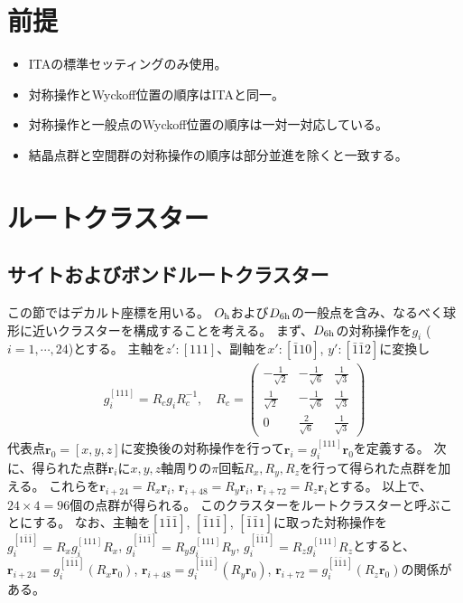 \documentclass[11pt]{easymemo}
\begin{document}


\section{前提}
\begin{itemize}
\item ITAの標準セッティングのみ使用。
\item 対称操作とWyckoff位置の順序はITAと同一。
\item 対称操作と一般点のWyckoff位置の順序は一対一対応している。
\item 結晶点群と空間群の対称操作の順序は部分並進を除くと一致する。
\end{itemize}

\section{ルートクラスター}

\subsection{サイトおよびボンドルートクラスター}

この節ではデカルト座標を用いる。
$O_{\rm h}$および$D_{\rm 6h}$の一般点を含み、なるべく球形に近いクラスターを構成することを考える。
まず、$D_{\rm 6h}$の対称操作を$g_i$ ($i=1,\cdots,24$)とする。
主軸を$z':[111]$、副軸を$x':[\bar{1}10]$, $y':[\bar{1}\bar{1}2]$に変換し
\begin{align}
g_i^{[111]}=R_cg_iR_c^{-1},
\quad
R_c = \begin{pmatrix}
-\frac{1}{\sqrt{2}} & -\frac{1}{\sqrt{6}} & \frac{1}{\sqrt{3}} \\
\frac{1}{\sqrt{2}} & -\frac{1}{\sqrt{6}} & \frac{1}{\sqrt{3}} \\
0 & \frac{2}{\sqrt{6}} & \frac{1}{\sqrt{3}}
\end{pmatrix}
\end{align}
代表点$\bm{r}_0=[x,y,z]$に変換後の対称操作を行って$\bm{r}_i=g_i^{[111]}\bm{r}_0$を定義する。
次に、得られた点群$\bm{r}_i$に$x,y,z$軸周りの$\pi$回転$R_x,R_y,R_z$を行って得られた点群を加える。
これらを$\bm{r}_{i+24}=R_x\bm{r}_i$, $\bm{r}_{i+48}=R_y\bm{r}_i$, $\bm{r}_{i+72}=R_z\bm{r}_i$とする。
以上で、$24\times 4=96$個の点群が得られる。
このクラスターをルートクラスターと呼ぶことにする。
なお、主軸を$[1\bar{1}\bar{1}]$, $[\bar{1}1\bar{1}]$, $[\bar{1}\bar{1}1]$に取った対称操作を$g_i^{[1\bar{1}\bar{1}]}=R_xg_i^{[111]}R_x$, $g_i^{[\bar{1}1\bar{1}]}=R_yg_i^{[111]}R_y$, $g_i^{[\bar{1}\bar{1}1]}=R_zg_i^{[111]}R_z$とすると、$\bm{r}_{i+24}=g_i^{[1\bar{1}\bar{1}]}(R_x\bm{r}_0)$, $\bm{r}_{i+48}=g_i^{[\bar{1}1\bar{1}]}(R_y\bm{r}_0)$, $\bm{r}_{i+72}=g_i^{[\bar{1}\bar{1}1]}(R_z\bm{r}_0)$の関係がある。
\end{document}
